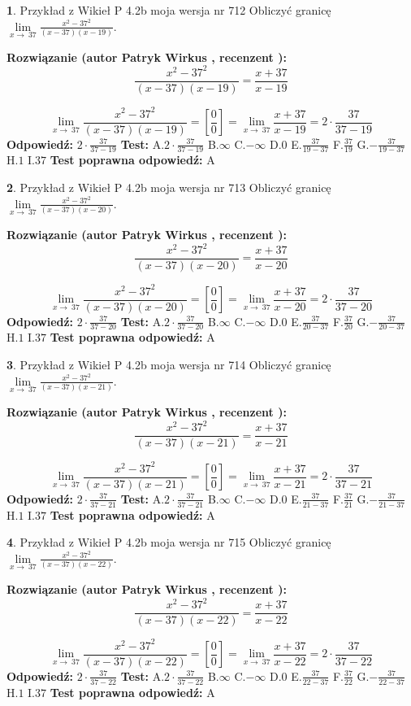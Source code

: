 \documentclass[12pt, a4paper]{article}
\theoremstyle{definition} %
\newtheorem{zad}{}
\newcommand{\zadStart}[1]{\begin{zad}#1\newline}
\newcommand{\zadStop}{\end{zad}}
\newcommand{\rozwStart}[2]{\noindent \textbf{Rozwiązanie (autor #1 , recenzent #2): }\newline}
\newcommand{\rozwStop}{\newline}
\newcommand{\odpStart}{\noindent \textbf{Odpowiedź:}\newline}
\newcommand{\odpStop}{\newline}
\newcommand{\testStart}{\noindent \textbf{Test:}\newline}
\newcommand{\testStop}{\newline}
\newcommand{\kluczStart}{\noindent \textbf{Test poprawna odpowiedź:}\newline}
\newcommand{\kluczStop}{\newline}
\begin{document}
\zadStart{Przykład z Wikieł P 4.2b moja wersja nr 712}
Obliczyć granicę $\lim\limits_{x\to\ 37}\frac{x^{2}-37^{2}}{(x-37)(x-19)}$.
\zadStop
\rozwStart{Patryk Wirkus}{}
$$\frac{x^{2}-37^{2}}{(x-37)(x-19)}=\frac{x+37}{x-19}$$

$$\lim\limits_{x\to\ 37}\frac{x^{2}-37^{2}}{(x-37)(x-19)}=[\frac{0}{0}]=\lim\limits_{x\to\ 37}\frac{x+37}{x-19}=2 \cdot \frac{37}{37-19}$$
\rozwStop
\odpStart
$2 \cdot \frac{37}{37-19}$
\odpStop
\testStart
A.$2 \cdot \frac{37}{37-19}$
B.$\infty$
C.$-\infty$
D.$0$
E.$\frac{37}{19-37}$
F.$\frac{37}{19}$
G.$-\frac{37}{19-37}$
H.$1$
I.$37$
\testStop
\kluczStart
A
\kluczStop



\zadStart{Przykład z Wikieł P 4.2b moja wersja nr 713}
Obliczyć granicę $\lim\limits_{x\to\ 37}\frac{x^{2}-37^{2}}{(x-37)(x-20)}$.
\zadStop
\rozwStart{Patryk Wirkus}{}
$$\frac{x^{2}-37^{2}}{(x-37)(x-20)}=\frac{x+37}{x-20}$$

$$\lim\limits_{x\to\ 37}\frac{x^{2}-37^{2}}{(x-37)(x-20)}=[\frac{0}{0}]=\lim\limits_{x\to\ 37}\frac{x+37}{x-20}=2 \cdot \frac{37}{37-20}$$
\rozwStop
\odpStart
$2 \cdot \frac{37}{37-20}$
\odpStop
\testStart
A.$2 \cdot \frac{37}{37-20}$
B.$\infty$
C.$-\infty$
D.$0$
E.$\frac{37}{20-37}$
F.$\frac{37}{20}$
G.$-\frac{37}{20-37}$
H.$1$
I.$37$
\testStop
\kluczStart
A
\kluczStop



\zadStart{Przykład z Wikieł P 4.2b moja wersja nr 714}
Obliczyć granicę $\lim\limits_{x\to\ 37}\frac{x^{2}-37^{2}}{(x-37)(x-21)}$.
\zadStop
\rozwStart{Patryk Wirkus}{}
$$\frac{x^{2}-37^{2}}{(x-37)(x-21)}=\frac{x+37}{x-21}$$

$$\lim\limits_{x\to\ 37}\frac{x^{2}-37^{2}}{(x-37)(x-21)}=[\frac{0}{0}]=\lim\limits_{x\to\ 37}\frac{x+37}{x-21}=2 \cdot \frac{37}{37-21}$$
\rozwStop
\odpStart
$2 \cdot \frac{37}{37-21}$
\odpStop
\testStart
A.$2 \cdot \frac{37}{37-21}$
B.$\infty$
C.$-\infty$
D.$0$
E.$\frac{37}{21-37}$
F.$\frac{37}{21}$
G.$-\frac{37}{21-37}$
H.$1$
I.$37$
\testStop
\kluczStart
A
\kluczStop



\zadStart{Przykład z Wikieł P 4.2b moja wersja nr 715}
Obliczyć granicę $\lim\limits_{x\to\ 37}\frac{x^{2}-37^{2}}{(x-37)(x-22)}$.
\zadStop
\rozwStart{Patryk Wirkus}{}
$$\frac{x^{2}-37^{2}}{(x-37)(x-22)}=\frac{x+37}{x-22}$$

$$\lim\limits_{x\to\ 37}\frac{x^{2}-37^{2}}{(x-37)(x-22)}=[\frac{0}{0}]=\lim\limits_{x\to\ 37}\frac{x+37}{x-22}=2 \cdot \frac{37}{37-22}$$
\rozwStop
\odpStart
$2 \cdot \frac{37}{37-22}$
\odpStop
\testStart
A.$2 \cdot \frac{37}{37-22}$
B.$\infty$
C.$-\infty$
D.$0$
E.$\frac{37}{22-37}$
F.$\frac{37}{22}$
G.$-\frac{37}{22-37}$
H.$1$
I.$37$
\testStop
\kluczStart
A
\kluczStop
\end{document}

